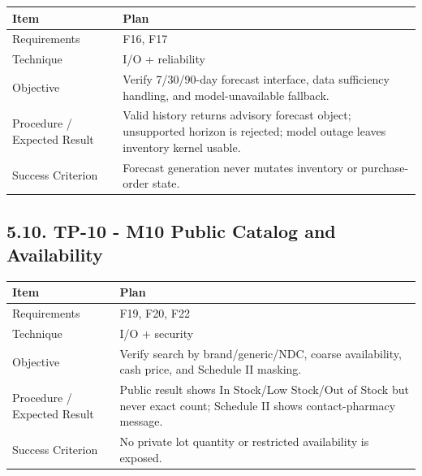 {\def\LTcaptype{none} %
\begin{longtable}[]{|
  >{\raggedright\arraybackslash}m{}|
  >{\raggedright\arraybackslash}m{}|}
\hline
\begin{minipage}[c]{\linewidth}\raggedright
\textbf{Item}
\end{minipage} & \begin{minipage}[c]{\linewidth}\raggedright
\textbf{Plan}
\end{minipage} \\
\hline
\endhead

\endlastfoot
Requirements & F16, F17 \\ \hline
Technique & I/O + reliability \\ \hline
Objective & Verify 7/30/90-day forecast interface, data sufficiency handling, and model-unavailable fallback. \\ \hline
Procedure / Expected Result & Valid history returns advisory forecast object; unsupported horizon is rejected; model outage leaves inventory kernel usable. \\ \hline
Success Criterion & Forecast generation never mutates inventory or purchase-order state. \\ \hline
\end{longtable}
}

\subsection{5.10. TP-10 - M10 Public Catalog and Availability}\label{tp-10---m10-public-catalog-and-availability}

{\def\LTcaptype{none} %
\begin{longtable}[]{|
  >{\raggedright\arraybackslash}m{}|
  >{\raggedright\arraybackslash}m{}|}
\hline
\begin{minipage}[c]{\linewidth}\raggedright
\textbf{Item}
\end{minipage} & \begin{minipage}[c]{\linewidth}\raggedright
\textbf{Plan}
\end{minipage} \\
\hline
\endhead

\endlastfoot
Requirements & F19, F20, F22 \\ \hline
Technique & I/O + security \\ \hline
Objective & Verify search by brand/generic/NDC, coarse availability, cash price, and Schedule II masking. \\ \hline
Procedure / Expected Result & Public result shows In Stock/Low Stock/Out of Stock but never exact count; Schedule II shows contact-pharmacy message. \\ \hline
Success Criterion & No private lot quantity or restricted availability is exposed. \\ \hline
\end{longtable}
}

